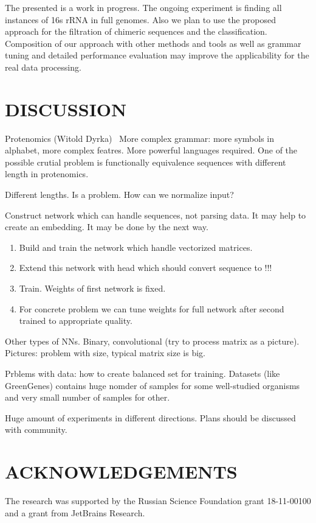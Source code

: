 \documentclass[a4paper,twoside]{article}
\begin{document}
\noindent The presented is a work in progress. 
The ongoing experiment is finding all instances of 16s rRNA in full genomes.
Also we plan to use the proposed approach for the filtration of chimeric sequences and the classification.
Composition of our approach with other methods and tools as well as grammar tuning and detailed performance evaluation may improve the applicability for the real data processing.


\section{\uppercase{Discussion}}
\label{sec:Discussion}

Protenomics (Witold Dyrka)~\cite{DBLP:Witold:Proteins}
More complex grammar: more symbols in alphabet, more complex featres.
More powerful languages required.
One of the possible crutial problem is functionally equivalence sequences with different length in protenomics.

Different lengths. Is a problem.
How can we normalize input?

Construct network which can handle sequences, not parsing data.
It may help to create an embedding.
It may be done by the next way.
\begin{enumerate}
\item Build and train the network which handle vectorized matrices.
\item Extend this network with head which should convert sequence to !!!
\item Train. Weights of first network is fixed.
\item For concrete problem we can tune weights for full network after second trained to appropriate quality.
\end{enumerate}

Other types of NNs.
Binary, convolutional (try to process matrix as a picture).
Pictures: problem with size, typical matrix size is big.

Prblems with data: how to create balanced set for training.
Datasets (like GreenGenes) contains huge nomder of samples for some well-studied organisms and very small number of samples for other.

Huge amount of experiments in different directions.
Plans should be discussed with community.


\section*{\uppercase{Acknowledgements}}

\noindent The research was supported by the Russian Science Foundation grant 18-11-00100 and a grant from JetBrains Research.


\vfill

{\small
}


\vfill
\end{document}
